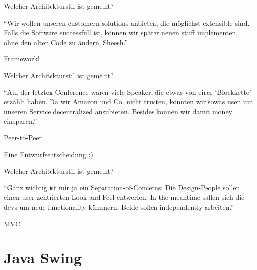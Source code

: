 \documentclass[18pt]{beamer}
\begin{document}
\begin{frame}{Welcher Architekturstil ist gemeint?}
	\begin{block}{}
		\enquote{Wir wollen unseren customern solutions anbieten, die möglichst extensible sind. Falls die Software successfull ist, können wir später neuen stuff implementen, ohne den alten Code zu ändern. Sheesh.}
	\end{block}
	\pause 
	Framework!
\end{frame}

\begin{frame}{Welcher Architekturstil ist gemeint?}
	\begin{block}{}
	\enquote{Auf der letzten Conference waren viele Speaker, die etwas von einer \enquote{Blockkette} erzählt haben. Da wir Amazon und Co. nicht trusten, könnten wir sowas usen um unseren Service decentralized anzubieten. Besides können wir damit money einsparen.}
	\end{block}
	\pause
	Peer-to-Peer
\end{frame}

\begin{frame}{Eine Entwurfsentscheidung :)}
	\begin{figure}
		\centering
	\end{figure}

\end{frame}

\begin{frame}{Welcher Architekturstil ist gemeint?}
	\begin{block}{}
		\enquote{Ganz wichtig ist mir ja ein Separation-of-Concerns: Die Design-People sollen einen user-zentrierten Look-and-Feel entwerfen. In the meantime sollen sich die devs um neue functionality kümmern. Beide sollen independently arbeiten.}
	\end{block}
	\pause
	MVC
\end{frame}

\section{Java Swing}
\end{document}
